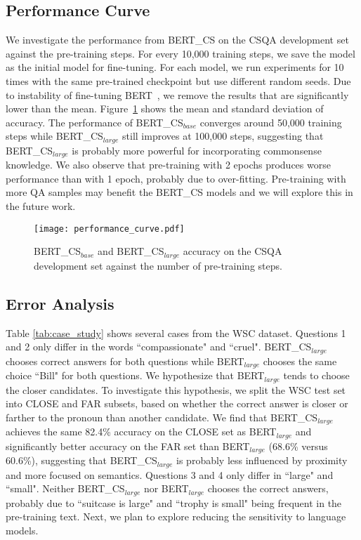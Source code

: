 \documentclass[11pt,a4paper]{article}
\begin{document}
\subsection{Performance Curve}
We investigate the performance from BERT\_CS on the CSQA development set against the pre-training steps.
For every 10,000 training steps, we save the model as the initial model for fine-tuning. 
For each model, we run experiments for 10 times with the same pre-trained checkpoint but use different random seeds.
Due to instability of fine-tuning BERT~\citep{devlin-etal-2019-bert}, we remove the results that are significantly lower than the mean.
Figure~\ref{fig:performance_curve} shows the mean and standard deviation of accuracy. The performance of BERT\_CS$_{base}$ converges around 50,000 training steps while BERT\_CS$_{large}$ still improves at 100,000 steps, suggesting that BERT\_CS$_{large}$ is probably more powerful for incorporating commonsense knowledge.
We also observe that pre-training with 2 epochs produces worse performance than with 1 epoch, probably due to over-fitting.
Pre-training with more QA samples may benefit the BERT\_CS models and we will explore this in the future work.

\begin{figure}[!t]
	\centering
	\texttt{[image: performance\_curve.pdf]}
	\caption{BERT\_CS$_{base}$ and BERT\_CS$_{large}$ accuracy on the CSQA development set against the number of pre-training steps.}
	\label{fig:performance_curve}
\end{figure}

\subsection{Error Analysis}
Table \ref{tab:case_study} shows several cases from the WSC dataset. 
Questions 1 and 2 only differ in the words ``compassionate" and ``cruel".
BERT\_CS$_{large}$ chooses correct answers for both questions while BERT$_{large}$ chooses the same choice ``Bill" for both questions. 
We hypothesize that BERT$_{large}$ tends to choose the closer candidates. To investigate this hypothesis, we split the WSC test set into CLOSE and FAR subsets, based on whether the correct answer is closer or farther to the pronoun than another candidate.
We find that BERT\_CS$_{large}$ achieves the same 82.4\% accuracy on the CLOSE set as BERT$_{large}$ and significantly better accuracy on the FAR set than BERT$_{large}$ (68.6\% versus 60.6\%), suggesting that BERT\_CS$_{large}$ is probably less influenced by proximity and more focused on semantics. Questions 3 and 4 only differ in ``large" and ``small".
Neither BERT\_CS$_{large}$ nor BERT$_{large}$ chooses the correct answers, probably due to ``suitcase is large" and ``trophy is small" being frequent in the pre-training text. Next, we plan to explore reducing the sensitivity to language models.
\end{document}
